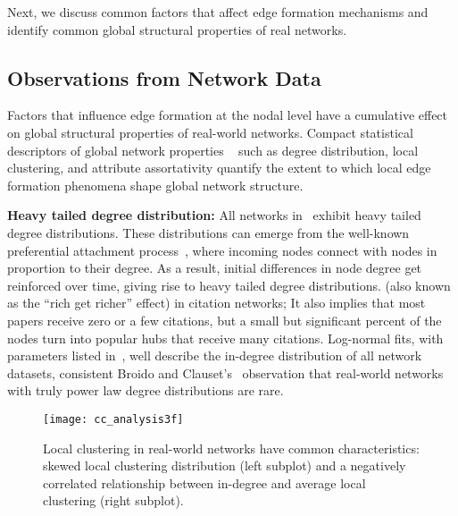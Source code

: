 %
Next, we discuss common factors that affect edge formation mechanisms and identify common global structural
properties of real networks.


\subsection{Observations from Network Data}
\label{subsec:factors}

Factors that influence edge formation at the nodal level have a cumulative
effect on global structural properties of real-world networks.
Compact
statistical descriptors of global network properties ~\cite{newman2010networks}
such as degree distribution, local clustering, and attribute assortativity
quantify the extent to which local edge formation phenomena shape global network
structure.

\textbf{Heavy tailed degree distribution:} All networks in~ exhibit heavy tailed degree distributions. These
distributions can emerge from the well-known preferential attachment process~\cite{simon1955class,barabasi1999emergence}, where incoming nodes connect with nodes in proportion to their degree. As a result, initial differences in node
degree get reinforced over time, giving rise to heavy
tailed degree distributions.
(also known as the ``rich get richer'' effect) in citation networks; It also implies that most papers receive zero or a few
citations, but a small but significant percent of the nodes turn into popular
hubs that receive many citations.
Log-normal fits, with parameters listed in~, well describe the in-degree
distribution of all network datasets, consistent Broido and Clauset's~\cite{broido2018scale} observation that real-world networks with truly power law
degree distributions are rare.

\begin{figure}[H]
 \vspace{-10pt}
 \centering
 \texttt{[image: cc\_analysis3f]}
 \caption{
    Local clustering in real-world networks have common characteristics:
    skewed local clustering distribution (left subplot) and a negatively correlated
    relationship between in-degree and average local clustering (right subplot).
 }
 \label{fig:cc_dc}
 \vspace{-10pt}
\end{figure}

